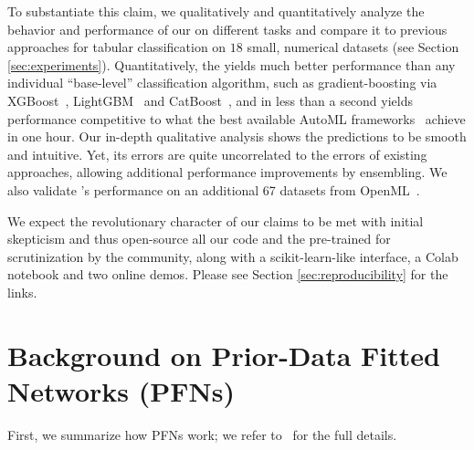 \documentclass{article}
\begin{document}
To substantiate this claim, we qualitatively and quantitatively analyze the behavior and performance of our \methodname{} on different tasks and compare it to previous approaches for tabular classification on $18$ small, numerical datasets (see Section \ref{sec:experiments}). 
Quantitatively, the \methodname{} yields much better performance than any individual ``base-level'' classification algorithm, such as gradient-boosting via XGBoost~\citep{chen-kdd16a}, LightGBM~\citep{ke-neurips17a} and CatBoost~\citep{prokhorenkova-neurips18a}, and in less than a second yields performance competitive to what the best available AutoML frameworks~\citep{erickson-arxiv20a,feurer-arxiv20v2} achieve in one hour.
Our in-depth qualitative analysis shows the \methodname{} predictions to be smooth and intuitive. Yet, its errors are quite uncorrelated to the errors of existing approaches, 
allowing additional performance improvements by ensembling. We also validate \methodname{}'s performance on an additional 67 datasets from OpenML~\cite{vanschoren-sigkdd14a}.

We expect the revolutionary character of our claims to be met with initial skepticism and thus open-source all our code and the pre-trained \methodname{} for scrutinization by the community, along with a scikit-learn-like interface, a Colab notebook and two online demos. Please see Section \ref{sec:reproducibility} for the links.



\section{Background on Prior-Data Fitted Networks (PFNs)}
\label{sec:prior_fitted_intro}

First, we summarize how PFNs work; we refer to~\cite{muller-iclr22a} for the full details.
\end{document}
